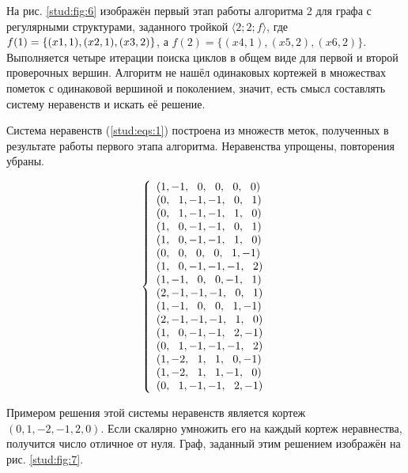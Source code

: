 \documentclass[14pt]{mmcs_article}
\begin{document}
На рис. \ref{stud:fig:6} изображён первый этап работы алгоритма 2 для графа с регулярными структурами, заданного тройкой $ \langle 2; 2; f\rangle $, где $ f(1) = \{ (x1, 1),\\ (x2, 1), (x3, 2) \} $, а $f(2) = \{ (x4, 1), (x5, 2), (x6, 2) \}$. Выполняется четыре итерации поиска циклов в общем виде для первой и второй проверочных вершин. Алгоритм не нашёл одинаковых кортежей в множествах пометок с одинаковой вершиной и поколением, значит, есть смысл составлять систему неравенств и искать её решение.

Система неравенств (\ref{stud:eqs:1}) построена из множеств меток, полученных в результате работы первого этапа алгоритма. Неравенства упрощены, повторения убраны.

\begin{equation}
  \centering
    \left\{
      \begin{array}{ll}
        (1,-1,\ \ 0,\ \ 0,\ \ 0,\ \ 0)\\
        (0,\ \ 1,-1,-1,\ \ 0,\ \ 1)\\
        (0,\ \ 1,-1,-1,\ \ 1,\ \ 0)\\
        (1,\ \ 0,-1,-1,\ \ 0,\ \ 1)\\
        (1,\ \ 0,-1,-1,\ \ 1,\ \ 0)\\
        (0,\ \ 0,\ \ 0,\ \ 0,\ \ 1,-1)\\
        (1,\ \ 0,-1,-1,-1,\ \ 2)\\
        (1,-1,\ \ 0,\ \ 0,-1,\ \ 1)\\
        (2,-1,-1,-1,\ \ 0,\ \ 1)\\
        (1,-1,\ \ 0,\ \ 0,\ \ 1,-1)\\
        (2,-1,-1,-1,\ \ 1,\ \ 0)\\
        (1,\ \ 0,-1,-1,\ \ 2,-1)\\
        (0,\ \ 1,-1,-1,-1,\ \ 2)\\
        (1,-2,\ \ 1,\ \ 1,\ \ 0,-1)\\
        (1,-2,\ \ 1,\ \ 1,-1,\ \ 0)\\
        (0,\ \ 1,-1,-1,\ \ 2,-1)\\
      \end{array}
    \right.
  \label{stud:eqs:1}
\end{equation}

Примером решения этой системы неравенств является кортеж\\ $(0, 1, -2, -1, 2, 0)$. Если скалярно умножить его на каждый кортеж неравнества, получится число отличное от нуля. Граф, заданный этим решением изображён на рис. \ref{stud:fig:7}.
\end{document}
